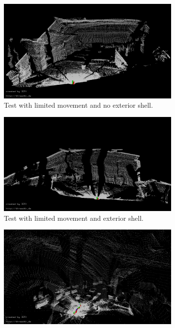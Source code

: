 \begin{figure}
\begin{subfigure}[b]{0.32\textwidth}
	\centering
	\includegraphics[width=\textwidth]{../Media/FirstDecentMap}
	\caption{Test with limited movement and no exterior shell.}
	\label{sec:experimentalResults:3DLaserScanning:fig:firstpointcloud}
\end{subfigure}
\begin{subfigure}[b]{0.32\textwidth}
	\centering
	\includegraphics[width=\textwidth]{../Media/testScanWithTop}
	\caption{Test with limited movement and exterior shell.}
	\label{sec:experimentalResults:3DLaserScanning:fig:secondpointcloud}
\end{subfigure}
\begin{subfigure}[b]{0.32\textwidth}
	\centering
	\includegraphics[width=\textwidth]{../Media/RollingTestMap}

\end{subfigure}
\end{figure}
